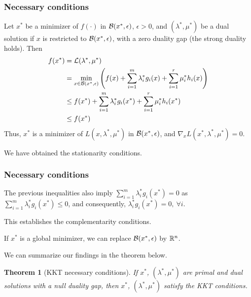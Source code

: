 \documentclass[usepdftitle=false]{beamer}
\newtheorem{thm}{Theorem}
\begin{document}
\begin{frame}
	\frametitle{Necessary conditions}
	
	Let $x^*$ be a minimizer of $f(\cdot)$ in ${\mathcal{B}}(x^*,\epsilon)$, $\epsilon > 0$, and $(\lambda^*, \mu^*)$ be a dual solution if $x$ is restricted to ${\mathcal{B}}(x^*,\epsilon)$, with a zero duality gap (the strong duality holds). Then
	\begin{align*}
		f(x^*) &= {\mathcal{L}}(\lambda^*, \mu^*) \\
		&= \min_{x \in {\mathcal{B}}(x^*,\epsilon)} \left( f(x) + \sum_{i = 1}^m \lambda_i^* g_i(x) + \sum_{i = 1}^r \mu_i^* h_i(x) \right) \\
		& \leq f(x^*) + \sum_{i = 1}^m \lambda_i^* g_i(x^*) + \sum_{i = 1}^r \mu_i^* h_i(x^*) \\
		& \leq f(x^*)
	\end{align*}
	Thus, $x^*$ is a minimizer of $L(x, \lambda^*, \mu^*)$ in ${\mathcal{B}}(x^*,\epsilon)$, and $\nabla_x L(x^*, \lambda^*, \mu^*) = 0$.
	
	\mbox{}
	
We have obtained the stationarity conditions.
	
\end{frame}

\begin{frame}
	\frametitle{Necessary conditions}
	
	The previous inequalities also imply $\sum_{i = 1}^m \lambda_i^* g_i(x^*) = 0$ as $\sum_{i = 1}^m \lambda_i^* g_i(x^*) \leq 0$, and consequently, $\lambda_i^* g_i(x^*) = 0,\ \forall i$.
	
	\mbox{}
	
	This establishes the complementarity conditions.
	
	\mbox{}
	
	If $x^*$ is a global minimizer, we can replace ${\mathcal{B}}(x^*,\epsilon)$ by ${\mathbb{R}}^n$.
	
	\mbox{}
	
	We can summarize our findings in the theorem below.
\begin{thm}[KKT necessary conditions]
	If $x^*$, $(\lambda^*, \mu^*)$ are primal and dual solutions with a null duality gap, then $x^*$, $(\lambda^*, \mu^*)$ satisfy the KKT conditions.
\end{thm}

\end{frame}
\end{document}

